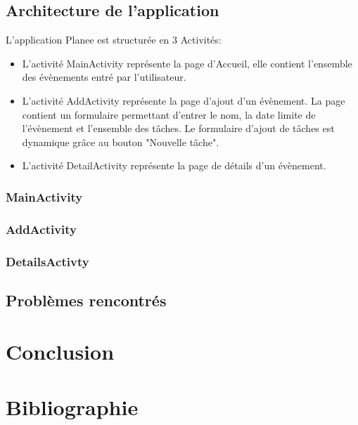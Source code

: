 \documentclass[12pt,a4paper]{report}
\begin{document}
\section{Architecture de l'application}
\begin{flushleft}
\justify
L'application Planee est structurée en 3 Activités:
\begin{itemize}
\item L'activité MainActivity représente la page d'Accueil, elle contient l'ensemble des évènements entré par l'utilisateur.
\item L'activité AddActivity représente la page d'ajout d'un évènement. La page contient un formulaire permettant d'entrer le nom, la date limite de l'évènement et l'ensemble des tâches. Le formulaire d'ajout de tâches est dynamique grâce au bouton "Nouvelle tâche".
\item L'activité DetailActivity représente la page de détails d'un évènement.
\end{itemize}
\end{flushleft}
\subsection{MainActivity}
\subsection{AddActivity}
\subsection{DetailsActivty}
\section{Problèmes rencontrés}

\newpage
\chapter{Conclusion}
\newpage
\chapter{Bibliographie}
\end{document}
